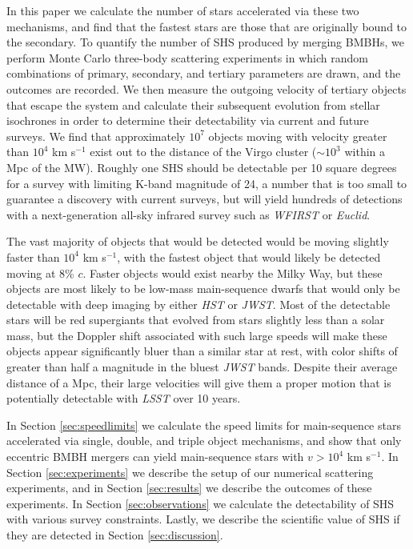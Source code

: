 \documentclass[a4paper,twocolumn]{emulateapj}
\begin{document}
In this paper we calculate the number of stars accelerated via these two mechanisms, and find that the fastest stars are those that are originally bound to the secondary. To quantify the number of SHS produced by merging BMBHs, we perform Monte Carlo three-body scattering experiments in which random combinations of primary, secondary, and tertiary parameters are drawn, and the outcomes are recorded. We then measure the outgoing velocity of tertiary objects that escape the system and calculate their subsequent evolution from stellar isochrones in order to determine their detectability via current and future surveys. We find that approximately $10^{7}$ objects moving with velocity greater than $10^{4}$ km s$^{-1}$ exist out to the distance of the Virgo cluster ($\sim 10^{3}$ within a Mpc of the MW). Roughly one SHS should be detectable per 10 square degrees for a survey with limiting K-band magnitude of 24, a number that is too small to guarantee a discovery with current surveys, but will yield hundreds of detections with a next-generation all-sky infrared survey such as {\it WFIRST} or {\it Euclid}.

The vast majority of objects that would be detected would be moving slightly faster than $10^{4}$ km s$^{-1}$, with the fastest object that would likely be detected moving at 8\% $c$. Faster objects would exist nearby the Milky Way, but these objects are most likely to be low-mass main-sequence dwarfs that would only be detectable with deep imaging by either {\it HST} or {\it JWST}. Most of the detectable stars will be red supergiants that evolved from stars slightly less than a solar mass, but the Doppler shift associated with such large speeds will make these objects appear significantly bluer than a similar star at rest, with color shifts of greater than half a magnitude in the bluest {\it JWST} bands. Despite their average distance of a Mpc, their large velocities will give them a proper motion that is potentially detectable with {\it LSST} over 10 years.

In Section \ref{sec:speedlimits} we calculate the speed limits for main-sequence stars accelerated via single, double, and triple object mechanisms, and show that only eccentric BMBH mergers can yield main-sequence stars with $v > 10^{4}$ km s$^{-1}$. In Section \ref{sec:experiments} we describe the setup of our numerical scattering experiments, and in Section \ref{sec:results} we describe the outcomes of these experiments. In Section \ref{sec:observations} we calculate the detectability of SHS with various survey constraints. Lastly, we describe the scientific value of SHS if they are detected in Section \ref{sec:discussion}.
\end{document}

